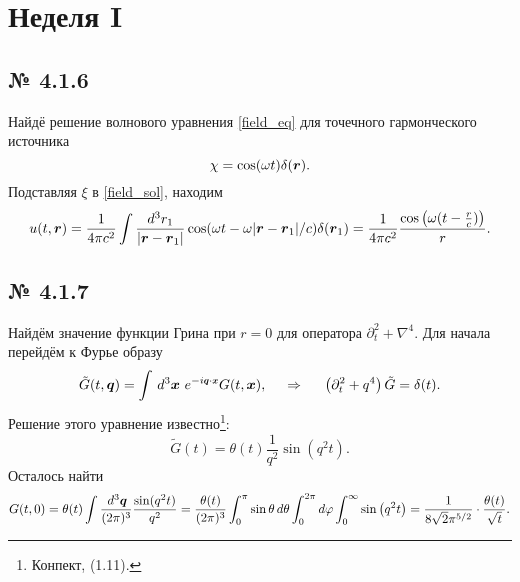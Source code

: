 \section{Неделя I}

\subsection*{№ 4.1.6}

Найдё решение волнового уравнения \eqref{field_eq} для точечного гармонческого источника
\begin{equation*}
    \chi = \cos(\omega t) \delta(\mbox{\boldmath $r$}).
\end{equation*}
Подставляя $\xi$ в \eqref{field_sol}, находим
\begin{equation*}
    u(t, \mbox{\boldmath $r$}) = \frac{1}{4 \pi c^2} \int \frac{d^3 r_1}{|\mbox{\boldmath $r$} - \mbox{\boldmath $r$}_1|} \cos(\omega t - \omega |\mbox{\boldmath $r$} - \mbox{\boldmath $r$}_1|/c) \delta(\mbox{\boldmath $r$}_1) = 
    \frac{1}{4 \pi c^2} \frac{\cos\left(\omega (t - \frac{r}{c})\right)}{r} .
\end{equation*}




\subsection*{№ 4.1.7}

Найдём значение функции Грина при $r=0$ для оператора $\partial_t^2 + \nabla^4$. Для начала перейдём к Фурье образу
\begin{equation*}
    \tilde{G}(t, \vc{q}) = \int \d^3 \vc{x} \ e^{-i \smallvc{q} \cdot \smallvc{x}} G(t, \vc{x}),
    \hspace{0.5cm} \Rightarrow \hspace{0.5cm}
    \left(\partial_t^2 + q^4\right) \tilde{G} = \delta(t).
\end{equation*}
Решение этого уравнение известно\footnote{
    Конпект, (1.11).
}:
\begin{equation*}
    \tilde{G}(t) = \theta(t) \frac{1}{q^2} \sin\left(q^2 t\right).
\end{equation*}
Осталось найти 
\begin{equation*}
    G(t, 0) = \theta(t) \int \frac{\, d^3 \mbox{\boldmath $q$}}{(2 \pi)^3} \frac{\sin( q^2 t)}{q^2} = \frac{\theta(t)}{(2\pi)^3}
    \int_{0}^{\pi} \sin \theta \, d \theta \int_{0}^{2\pi} d \varphi \int_{0}^{\infty} \sin\left(q^2 t\right) = \frac{1}{8 \sqrt{2} \pi ^{5/2}} \cdot \frac{\theta(t) }{\sqrt{t}}.
\end{equation*}



